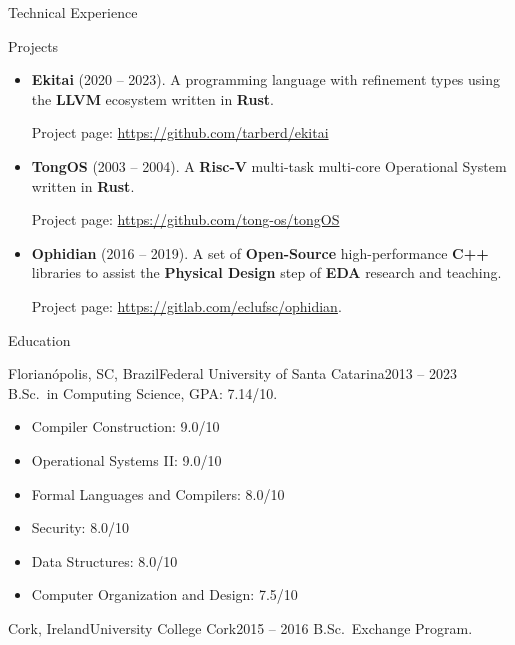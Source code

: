 \documentclass[calibri]{mcdowellcv}
\begin{document}
	\begin{cvsection}{Technical Experience}
		\begin{cvsubsection}{Projects}{}{}
			\begin{itemize}
				\item \textbf{Ekitai} (2020 -- 2023). A programming language with refinement types using the \textbf{LLVM} ecosystem written in \textbf{Rust}.

				Project page: \url{https://github.com/tarberd/ekitai}

				\item \textbf{TongOS} (2003 -- 2004). A \textbf{Risc-V} multi-task multi-core Operational System written in \textbf{Rust}.

				Project page: \url{https://github.com/tong-os/tongOS}

				\item \textbf{Ophidian} (2016 -- 2019). A set of \textbf{Open-Source} high-performance \textbf{C++} libraries to assist the \textbf{Physical Design} step of \textbf{EDA} research and teaching.

				Project page: \url{https://gitlab.com/eclufsc/ophidian}.
			\end{itemize}
		\end{cvsubsection}
	\end{cvsection}

	\newpage
	\begin{cvsection}{Education}
		\begin{cvsubsection}{Florianópolis, SC, Brazil}{Federal University of Santa Catarina}{2013 -- 2023}
			B.Sc.\ in Computing Science, GPA\@: 7.14/10.
			\begin{multicols}{2}
				\begin{itemize}
						\item Compiler Construction: 9.0/10
						\item Operational Systems II\@: 9.0/10
						\item Formal Languages and Compilers: 8.0/10
						\item Security: 8.0/10
						\item Data Structures: 8.0/10
						\item Computer Organization and Design: 7.5/10
				\end{itemize}
		  \end{multicols}
  	\end{cvsubsection}
		\begin{cvsubsection}{Cork, Ireland}{University College Cork}{2015 -- 2016}
			B.Sc.\ Exchange Program.
  	\end{cvsubsection}
	\end{cvsection}
\end{document}
